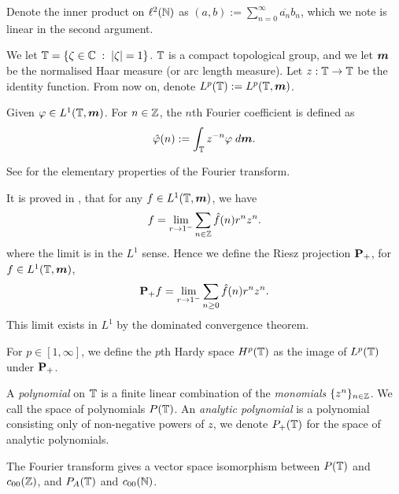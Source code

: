 Denote the inner product on $\ell^2(\mathbb{N})$ 
as $(a,b) := \sum_{n=0}^\infty \overline{a_n}b_n$, which we note
is linear in the second argument.

We let $\mathbb{T} = \{\zeta \in \mathbb{C}\;:\; |\zeta| = 1\}$. $\mathbb{T}$ is a compact
topological group, and we let $\boldsymbol{m}$ be the normalised Haar measure (or arc 
length measure). Let $z:\mathbb{T}\rightarrow\mathbb{T}$ be the identity function. 
From now on, denote $L^p(\mathbb{T}) := L^p(\mathbb{T},\boldsymbol{m})$.

Given $\varphi \in L^1(\mathbb{T},\boldsymbol{m})$. For $n \in \mathbb{Z}$, the $n$th Fourier
coefficient is defined as
\begin{equation*}
    \hat{\varphi}(n) := \int_{\mathbb{T}} z^{-n}\varphi\;d\boldsymbol{m}.
\end{equation*}

See \cite{meCesaro} for the elementary properties of the Fourier transform. 

It is proved in \cite{meAbel}, that for any $f \in L^1(\mathbb{T},\boldsymbol{m})$, we have
\begin{equation*}
    f = \lim_{r\rightarrow 1^{-}} \sum_{n \in \mathbb{Z}} \hat{f}(n)r^n z^n.
\end{equation*}
where the limit is in the $L^1$ sense. Hence we define the Riesz projection $\mathbf{P}_+$,
for $f \in L^1(\mathbb{T},\boldsymbol{m})$,
\begin{equation*}
    \mathbf{P}_+ f = \lim_{r\rightarrow 1^-} \sum_{n\geq 0} \hat{f}(n) r^n z^n.
\end{equation*}
This limit exists in $L^1$ by the dominated convergence theorem.

For $p \in [1,\infty]$, we define the $p$th Hardy space $H^p(\mathbb{T})$
as the image of $L^p(\mathbb{T})$ under $\mathbf{P}_+$.

A \emph{polynomial} on $\mathbb{T}$ is a finite linear combination of the \emph{monomials}
$\{z^n\}_{n \in \mathbb{Z}}$. We call the space of polynomials $P(\mathbb{T})$.
An \emph{analytic polynomial} is a polynomial consisting only of non-negative powers
of $z$, we denote $P_+(\mathbb{T})$ for the space of analytic polynomials. 

The Fourier transform gives a vector space isomorphism between $P(\mathbb{T})$
and $c_{00}(\mathbb{Z})$, and $P_A(\mathbb{T})$ and $c_{00}(\mathbb{N})$.

